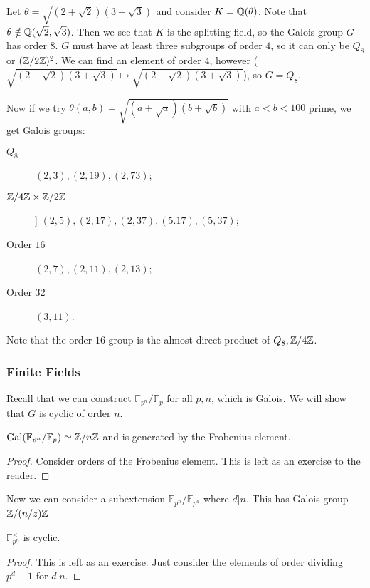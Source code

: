 \message{ !name(notes.tex)}\documentclass[10pt, twoside]{article}
\newcommand{\F}{\mathbb{F}}
\begin{document}
        \begin{exm}
            Let $\theta = \sqrt{(2+\sqrt{2})(3+\sqrt{3})}$ and consider $K = \mathbb{Q}(\theta)$. Note that $\theta \notin \mathbb{Q}(\sqrt{2}, \sqrt{3})$.  Then we see that $K$ is the splitting field, so the Galois group $G$ has order $8$. $G$ must have at least three subgroups of order $4$, so it can only be $Q_8$ or $(\mathbb{Z}/2\mathbb{Z})^2$. We can find an element of order $4$, however ($\sqrt{(2 + \sqrt{2})(3 + \sqrt{3})} \mapsto \sqrt{(2 - \sqrt{2})(3 + \sqrt{3})}$), so $G = Q_8$.
        \end{exm}

        Now if we try $\theta(a,b) = \sqrt{(a + \sqrt{a})(b + \sqrt{b})}$ with $a < b < 100$ prime, we get Galois groups:
        \begin{description}
            \item[$Q_8$] $(2,3), (2,19), (2,73)$;
            \item[$\mathbb{Z}/4\mathbb{Z} \times \mathbb{Z}/2\mathbb{Z}$]] $(2,5), (2,17), (2,37), (5.17), (5,37)$;
            \item[Order $16$] $(2,7), (2,11), (2,13)$;
            \item[Order $32$] $(3,11)$.
        \end{description}

        Note that the order $16$ group is the almost direct product of $Q_8, \mathbb{Z}/4\mathbb{Z}$. 

        \subsubsection{Finite Fields}
        Recall that we can construct $\F_{p^n}/\F_p$ for all $p,n$, which is Galois. We will show that $G$ is cyclic of order $n$.

        \begin{prop}
            $\mathrm{Gal}(\F_{p^n}/\F_p) \simeq \Z/n\Z$ and is generated by the Frobenius element.
            \begin{proof}
                Consider orders of the Frobenius element. This is left as an exercise to the reader.
            \end{proof}
        \end{prop}
        
        Now we can consider a subextension $\F_{p^n}/\F_{p^d}$ where $d | n$. This has Galois group $\mathbb{Z}/(n/z)\mathbb{Z}$.

        \begin{prop}
            $\F_{p^n}^{\times}$ is cyclic.
            \begin{proof}
                This is left as an exercise. Just consider the elements of order dividing $p^d-1$ for $d | n$.
            \end{proof}
        \end{prop}
\end{document}
